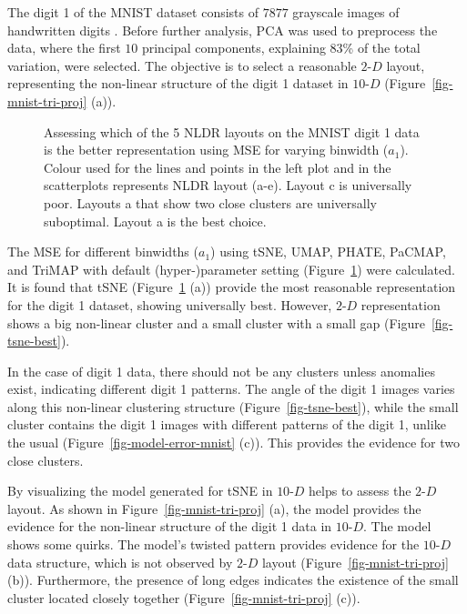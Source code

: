 \documentclass[
  12pt]{article}
\newcommand\gD{$2\text{-}D$}
\begin{document}
The digit 1 of the MNIST dataset consists of \(7877\) grayscale images
of handwritten digits \citep{lecun2010}. Before further analysis, PCA
was used to preprocess the data, where the first \(10\) principal
components, explaining 83\% of the total variation, were selected. The
objective is to select a reasonable \gD{} layout, representing the
non-linear structure of the digit 1 dataset in \(10\text{-}D\)
(Figure~\ref{fig-mnist-tri-proj} (a)).

\begin{figure}[H]


\caption{\label{fig-mnist-mse}Assessing which of the 5 NLDR layouts on
the MNIST digit 1 data is the better representation using MSE for
varying binwidth (\(a_1\)). Colour used for the lines and points in the
left plot and in the scatterplots represents NLDR layout (a-e). Layout c
is universally poor. Layouts a that show two close clusters are
universally suboptimal. Layout a is the best choice.}

\end{figure}%

The MSE for different binwidths (\(a_1\)) using tSNE, UMAP, PHATE,
PaCMAP, and TriMAP with default (hyper-)parameter setting
(Figure~\ref{fig-mnist-mse}) were calculated. It is found that tSNE
(Figure~\ref{fig-mnist-mse} (a)) provide the most reasonable
representation for the digit 1 dataset, showing universally best.
However, \gD{} representation shows a big non-linear cluster and a small
cluster with a small gap (Figure~\ref{fig-tsne-best}).

In the case of digit 1 data, there should not be any clusters unless
anomalies exist, indicating different digit 1 patterns. The angle of the
digit 1 images varies along this non-linear clustering structure
(Figure~\ref{fig-tsne-best}), while the small cluster contains the digit
1 images with different patterns of the digit 1, unlike the usual
(Figure~\ref{fig-model-error-mnist} (c)). This provides the evidence for
two close clusters.

By visualizing the model generated for tSNE in \(10\text{-}D\) helps to
assess the \gD{} layout. As shown in Figure~\ref{fig-mnist-tri-proj}
(a), the model provides the evidence for the non-linear structure of the
digit 1 data in \(10\text{-}D\). The model shows some quirks. The
model's twisted pattern provides evidence for the \(10\text{-}D\) data
structure, which is not observed by \gD{} layout
(Figure~\ref{fig-mnist-tri-proj} (b)). Furthermore, the presence of long
edges indicates the existence of the small cluster located closely
together (Figure~\ref{fig-mnist-tri-proj} (c)).
\end{document}
